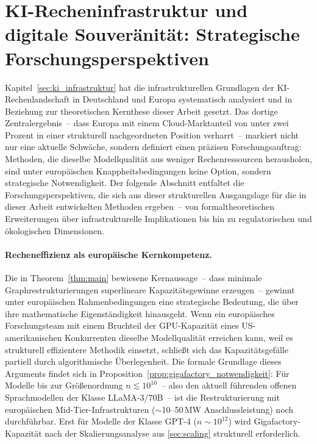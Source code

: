 \documentclass[12pt, a4paper, openany]{report}
\begin{document}
\section{KI-Recheninfrastruktur und digitale Souveränität:
  Strategische Forschungsperspektiven}
\label{sec:outlook_infrastruktur}

Kapitel~\ref{sec:ki_infrastruktur} hat die infrastrukturellen Grundlagen
der KI-Rechenlandschaft in Deutschland und Europa systematisch analysiert
und in Beziehung zur theoretischen Kernthese dieser Arbeit gesetzt.  Das
dortige Zentralergebnis~-- dass Europa mit einem Cloud-Marktanteil von
unter zwei Prozent in einer strukturell nachgeordneten Position verharrt~--
markiert nicht nur eine aktuelle Schwäche, sondern definiert einen
präzisen Forschungsauftrag: Methoden, die dieselbe Modellqualität aus
weniger Rechenressourcen herausholen, sind unter europäischen
Knappheitsbedingungen keine Option, sondern strategische Notwendigkeit.
Der folgende Abschnitt entfaltet die Forschungsperspektiven, die sich aus
dieser strukturellen Ausgangslage für die in dieser Arbeit entwickelten
Methoden ergeben~-- von formaltheoretischen Erweiterungen über
infrastrukturelle Implikationen bis hin zu regulatorischen und
ökologischen Dimensionen.

\paragraph{Recheneffizienz als europäische Kernkompetenz.}
Die in Theorem~\ref{thm:main} bewiesene Kernaussage~-- dass minimale
Graphrestrukturierungen superlineare Kapazitätsgewinne erzeugen~-- gewinnt
unter europäischen Rahmenbedingungen eine strategische Bedeutung, die über
ihre mathematische Eigenständigkeit hinausgeht.  Wenn ein europäisches
Forschungsteam mit einem Bruchteil der GPU-Kapazität eines US-amerikanischen
Konkurrenten dieselbe Modellqualität erreichen kann, weil es strukturell
effizientere Methodik einsetzt, schließt sich das Kapazitätsgefälle
partiell durch algorithmische Überlegenheit.  Die formale Grundlage dieses
Arguments findet sich in Proposition~\ref{prop:gigafactory_notwendigkeit}:
Für Modelle bis zur Größenordnung $n \lesssim 10^{10}$~-- also den aktuell
führenden offenen Sprachmodellen der Klasse LLaMA-3/70B~-- ist die
Restrukturierung mit europäischen Mid-Tier-Infrastrukturen
($\sim$10--50\,MW Anschlussleistung) noch durchführbar.  Erst für Modelle
der Klasse GPT-4 ($n \sim 10^{12}$) wird Gigafactory-Kapazität nach der
Skalierungsanalyse aus \cref{sec:scaling} strukturell erforderlich.
\end{document}
